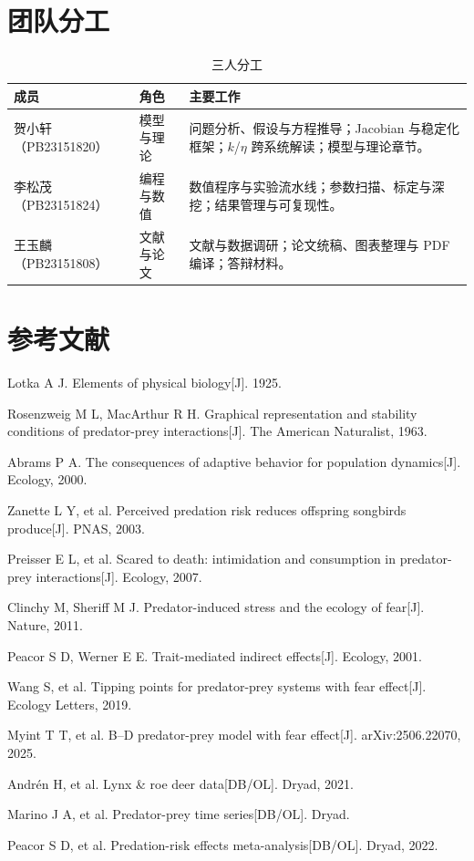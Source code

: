 \documentclass[12pt,a4paper]{ctexart}
\begin{document}
\section{团队分工}

\begin{table}[H]
  \centering
  \caption{三人分工}
  \label{tab:team}
  \small
  \begin{tabular}{>{\centering\arraybackslash}p{2.6cm}>{\centering\arraybackslash}p{2.2cm}>{\raggedright\arraybackslash}p{8.8cm}}
    \toprule
    成员 & 角色 & 主要工作 \\
    \midrule
    贺小轩（PB23151820） & 模型与理论 &
    问题分析、假设与方程推导；Jacobian 与稳定化框架；$k$/$\eta$ 跨系统解读；模型与理论章节。 \\
    李松茂（PB23151824） & 编程与数值 &
    数值程序与实验流水线；参数扫描、标定与深挖；结果管理与可复现性。 \\
    王玉麟（PB23151808） & 文献与论文 &
    文献与数据调研；论文统稿、图表整理与 PDF 编译；答辩材料。 \\
    \bottomrule
  \end{tabular}
\end{table}

\section*{参考文献}
\begin{enumerate}[label={[\arabic*]}]
  \item Lotka A J. Elements of physical biology[J]. 1925.
  \item Rosenzweig M L, MacArthur R H. Graphical representation and stability conditions of predator-prey interactions[J]. The American Naturalist, 1963.
  \item Abrams P A. The consequences of adaptive behavior for population dynamics[J]. Ecology, 2000.
  \item Zanette L Y, et al. Perceived predation risk reduces offspring songbirds produce[J]. PNAS, 2003.
  \item Preisser E L, et al. Scared to death: intimidation and consumption in predator-prey interactions[J]. Ecology, 2007.
  \item Clinchy M, Sheriff M J. Predator-induced stress and the ecology of fear[J]. Nature, 2011.
  \item Peacor S D, Werner E E. Trait-mediated indirect effects[J]. Ecology, 2001.
  \item Wang S, et al. Tipping points for predator-prey systems with fear effect[J]. Ecology Letters, 2019.
  \item Myint T T, et al. B--D predator-prey model with fear effect[J]. arXiv:2506.22070, 2025.
  \item Andrén H, et al. Lynx \& roe deer data[DB/OL]. Dryad, 2021.
  \item Marino J A, et al. Predator-prey time series[DB/OL]. Dryad.
  \item Peacor S D, et al. Predation-risk effects meta-analysis[DB/OL]. Dryad, 2022.
\end{enumerate}
\end{document}
